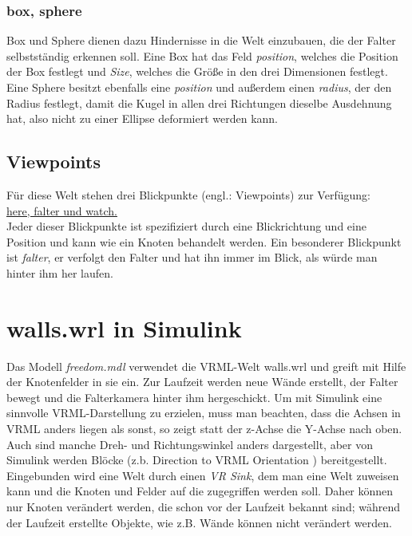 \documentclass[titlepage]{article}
\begin{document}
\subsubsection{box, sphere} 
Box und Sphere dienen dazu Hindernisse in die Welt einzubauen, die der Falter selbstständig erkennen soll. Eine Box hat das Feld {\em position}, welches die Position der Box festlegt und {\em Size}, welches die Größe in den drei Dimensionen festlegt. \\
Eine Sphere besitzt ebenfalls eine {\em position} und außerdem einen {\em radius}, der den Radius festlegt, damit die Kugel in allen drei Richtungen dieselbe Ausdehnung hat, also nicht zu einer Ellipse deformiert werden kann.
\subsection{Viewpoints}
Für diese Welt stehen drei Blickpunkte (engl.: Viewpoints) zur Verfügung:\\
\underline{here, falter und watch.}\\
Jeder dieser Blickpunkte ist spezifiziert durch eine Blickrichtung und eine Position und kann wie ein Knoten behandelt werden. Ein besonderer Blickpunkt ist {\em falter}, er verfolgt den Falter und hat ihn immer im Blick, als würde man hinter ihm her laufen.
\section{walls.wrl in Simulink}
Das Modell {\em freedom.mdl} verwendet die VRML-Welt walls.wrl und greift mit Hilfe der Knotenfelder in sie ein. Zur Laufzeit werden neue Wände erstellt, der Falter bewegt und die Falterkamera hinter ihm hergeschickt. Um mit Simulink eine sinnvolle VRML-Darstellung zu erzielen, muss man beachten, dass die Achsen in VRML anders liegen als sonst, so zeigt statt der z-Achse die Y-Achse nach oben.\\
Auch sind manche Dreh- und Richtungswinkel anders dargestellt, aber von Simulink werden Blöcke (z.b. \glqq Direction to VRML Orientation \grqq) bereitgestellt.\\
Eingebunden wird eine Welt durch einen {\em VR Sink}, dem man eine Welt zuweisen kann und die Knoten und Felder auf die zugegriffen werden soll. Daher können nur Knoten verändert werden, die schon vor der Laufzeit bekannt sind; während der Laufzeit erstellte Objekte, wie z.B. Wände können nicht verändert werden.
\end{document}
